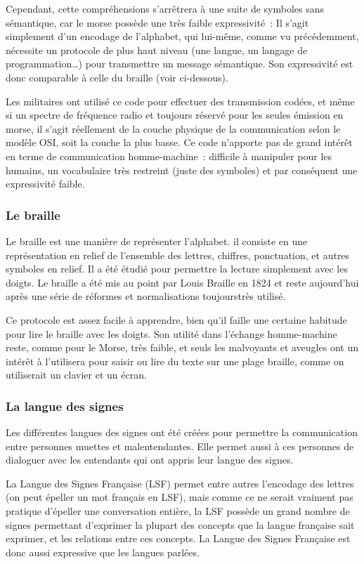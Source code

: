 \documentclass[french,a4paper]{article}
\begin{document}
Cependant, cette compréhensions s'arrêtrera à une suite de symboles
sans sémantique, car le morse possède une très faible expressivité~:
Il s'agit simplement d'un encodage de l'alphabet, qui lui-même, comme
vu précédemment, nécessite un protocole de plus haut niveau (une
langue, un langage de programmation…) pour transmettre un message
sémantique. Son expressivité est donc comparable à celle du braille
(voir ci-dessous).

Les militaires ont utilisé ce code pour effectuer des transmission
codées, et même si un spectre de fréquence radio et toujours réservé
pour les seules émission en morse, il s'agit réellement de la couche
physique de la communication selon le modèle OSI, soit la couche la
plus basse. Ce code n'apporte pas de grand intérêt en terme de
communication homme-machine~: difficile à manipuler pour les humains,
un vocabulaire très restreint (juste des symboles) et par conséquent
une expressivité faible.

\subsubsection{Le braille}
Le braille est une manière de représenter l'alphabet. il consiste en
une représentation en relief de l'ensemble des lettres, chiffres,
ponctuation, et autres symboles en relief. Il a été étudié pour
permettre la lecture simplement avec les doigts. Le braille a été mis
au point par Louis Braille en 1824 et reste aujourd'hui après une
série de réformes et normalisations toujourstrès utilisé.

Ce protocole est assez facile à apprendre, bien qu'il faille une
certaine habitude pour lire le braille avec les doigts. Son utilité
dans l'échange homme-machine reste, comme pour le Morse, très faible,
et seuls les malvoyants et aveugles ont un intérêt à l'utilisera pour
saisir ou lire du texte sur une plage braille, comme on utiliserait un
clavier et un écran.

\subsubsection{La langue des signes}
Les différentes langues des signes ont été créées pour permettre la
communication entre personnes muettes et malentendantes. Elle permet
aussi à ces personnes de dialoguer avec les entendants qui ont appris
leur langue des signes.

La Langue des Signes Française (LSF) permet entre autres l'encodage
des lettres (on peut épeller un mot français en LSF), mais comme ce ne
serait vraiment pas pratique d'épeller une conversation entière, la
LSF possède un grand nombre de signes permettant d'exprimer la plupart
des concepts que la langue française sait exprimer, et les relations
entre ces concepts. La Langue des Signes Française est donc aussi
expressive que les langues parlées.
\end{document}

